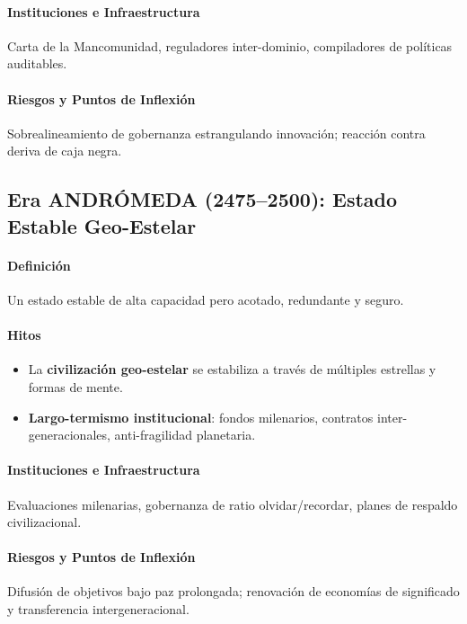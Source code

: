 \documentclass[11pt]{article}
\begin{document}
\paragraph{Instituciones e Infraestructura} Carta de la Mancomunidad, reguladores inter-dominio, compiladores de políticas auditables.

\paragraph{Riesgos y Puntos de Inflexión} Sobrealineamiento de gobernanza estrangulando innovación; reacción contra deriva de caja negra.

\subsection{Era ANDRÓMEDA (2475–2500): Estado Estable Geo-Estelar}
\paragraph{Definición} Un estado estable de alta capacidad pero acotado, redundante y seguro.

\paragraph{Hitos}
\begin{itemize}[noitemsep]
  \item La \textbf{civilización geo-estelar} se estabiliza a través de múltiples estrellas y formas de mente.
  \item \textbf{Largo-termismo institucional}: fondos milenarios, contratos inter-generacionales, anti-fragilidad planetaria.
\end{itemize}

\paragraph{Instituciones e Infraestructura} Evaluaciones milenarias, gobernanza de ratio olvidar/recordar, planes de respaldo civilizacional.

\paragraph{Riesgos y Puntos de Inflexión} Difusión de objetivos bajo paz prolongada; renovación de economías de significado y transferencia intergeneracional.
\end{document}
